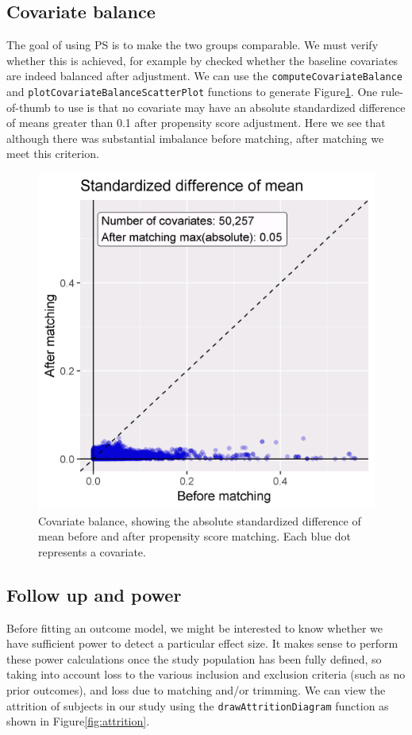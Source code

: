 \documentclass[11pt]{book}
\begin{document}
\subsection{Covariate balance}\label{covariate-balance}

The goal of using PS is to make the two groups comparable. We must
verify whether this is achieved, for example by checked whether the
baseline covariates are indeed balanced after adjustment. We can use the
\texttt{computeCovariateBalance} and
\texttt{plotCovariateBalanceScatterPlot} functions to generate
Figure\ref{fig:balance}. One rule-of-thumb to use is that no covariate
may have an absolute standardized difference of means greater than 0.1
after propensity score adjustment. Here we see that although there was
substantial imbalance before matching, after matching we meet this
criterion.

\begin{figure}

{\centering \includegraphics[width=0.7\linewidth]{images/PopulationLevelEstimation/balance} 

}

\caption{Covariate balance, showing the absolute standardized difference of mean before and after propensity score matching. Each blue dot represents a covariate.}\label{fig:balance}
\end{figure}

\subsection{Follow up and power}\label{follow-up-and-power}

Before fitting an outcome model, we might be interested to know whether
we have sufficient power to detect a particular effect size. It makes
sense to perform these power calculations once the study population has
been fully defined, so taking into account loss to the various inclusion
and exclusion criteria (such as no prior outcomes), and loss due to
matching and/or trimming. We can view the attrition of subjects in our
study using the \texttt{drawAttritionDiagram} function as shown in
Figure\ref{fig:attrition}.
\end{document}
